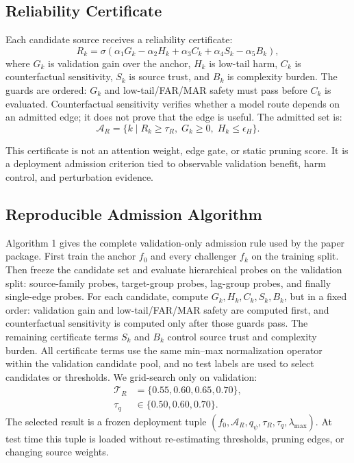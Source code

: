 \documentclass[letterpaper]{article}
\begin{document}
\subsection{Reliability Certificate}

Each candidate source receives a reliability certificate:
\begin{equation}
R_k =
\sigma(
\alpha_1 G_k -
\alpha_2 H_k +
\alpha_3 C_k +
\alpha_4 S_k -
\alpha_5 B_k),
\end{equation}
where $G_k$ is validation gain over the anchor, $H_k$ is low-tail harm, $C_k$ is counterfactual sensitivity, $S_k$ is source trust, and $B_k$ is complexity burden. The guards are ordered: $G_k$ and low-tail/FAR/MAR safety must pass before $C_k$ is evaluated. Counterfactual sensitivity verifies whether a model route depends on an admitted edge; it does not prove that the edge is useful. The admitted set is:
\begin{equation}
\mathcal{A}_R = \{k \mid R_k \ge \tau_R,\; G_k \ge 0,\; H_k \le \epsilon_H \}.
\end{equation}

This certificate is not an attention weight, edge gate, or static pruning score. It is a deployment admission criterion tied to observable validation benefit, harm control, and perturbation evidence.

\subsection{Reproducible Admission Algorithm}

Algorithm 1 gives the complete validation-only admission rule used by the paper package. First train the anchor $f_0$ and every challenger $f_k$ on the training split. Then freeze the candidate set and evaluate hierarchical probes on the validation split: source-family probes, target-group probes, lag-group probes, and finally single-edge probes. For each candidate, compute $G_k,H_k,C_k,S_k,B_k$, but in a fixed order: validation gain and low-tail/FAR/MAR safety are computed first, and counterfactual sensitivity is computed only after those guards pass. The remaining certificate terms $S_k$ and $B_k$ control source trust and complexity burden. All certificate terms use the same min--max normalization operator within the validation candidate pool, and no test labels are used to select candidates or thresholds. We grid-search only on validation:
\begin{equation}
\begin{aligned}
\mathcal{T}_R &= \{0.55,0.60,0.65,0.70\},\\
\tau_q &\in \{0.50,0.60,0.70\}.
\end{aligned}
\end{equation}
The selected result is a frozen deployment tuple $(f_0,\mathcal{A}_R,q_{\psi},\tau_R,\tau_q,\lambda_{\max})$. At test time this tuple is loaded without re-estimating thresholds, pruning edges, or changing source weights.
\end{document}

